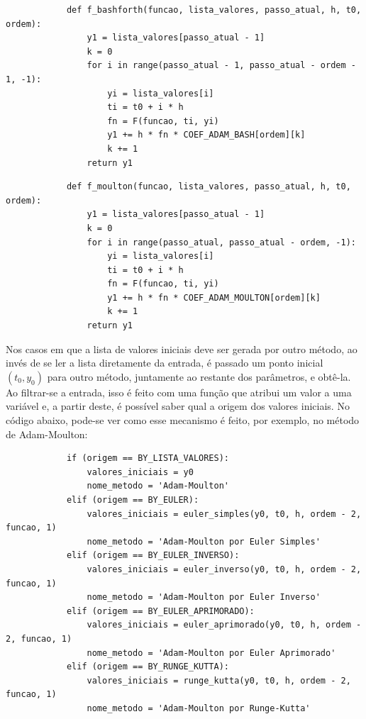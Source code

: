 \documentclass{article}
\begin{document}
\begin{otherlanguage}{brazil}
        \begin{lstlisting}
            def f_bashforth(funcao, lista_valores, passo_atual, h, t0, ordem):
                y1 = lista_valores[passo_atual - 1]
                k = 0
                for i in range(passo_atual - 1, passo_atual - ordem - 1, -1):
                    yi = lista_valores[i]
                    ti = t0 + i * h
                    fn = F(funcao, ti, yi)
                    y1 += h * fn * COEF_ADAM_BASH[ordem][k]
                    k += 1
                return y1
        \end{lstlisting}
        \begin{lstlisting}
            def f_moulton(funcao, lista_valores, passo_atual, h, t0, ordem):
                y1 = lista_valores[passo_atual - 1]
                k = 0
                for i in range(passo_atual, passo_atual - ordem, -1):
                    yi = lista_valores[i]
                    ti = t0 + i * h
                    fn = F(funcao, ti, yi)
                    y1 += h * fn * COEF_ADAM_MOULTON[ordem][k]
                    k += 1
                return y1
        \end{lstlisting}
        Nos casos em que a lista de valores iniciais deve ser gerada por outro método, ao invés de se ler a lista diretamente da entrada, é passado um ponto inicial $(t_0, y_0)$ para outro método, juntamente ao restante dos parâmetros, e obtê-la. Ao filtrar-se a entrada, isso é feito com uma função que atribui um valor a uma variável e, a partir deste, é possível saber qual a origem dos valores iniciais. No código abaixo, pode-se ver como esse mecanismo é feito, por exemplo, no método de Adam-Moulton:
        \begin{lstlisting}
            if (origem == BY_LISTA_VALORES):
                valores_iniciais = y0
                nome_metodo = 'Adam-Moulton'
            elif (origem == BY_EULER):
                valores_iniciais = euler_simples(y0, t0, h, ordem - 2, funcao, 1)
                nome_metodo = 'Adam-Moulton por Euler Simples'
            elif (origem == BY_EULER_INVERSO):
                valores_iniciais = euler_inverso(y0, t0, h, ordem - 2, funcao, 1)
                nome_metodo = 'Adam-Moulton por Euler Inverso'
            elif (origem == BY_EULER_APRIMORADO):
                valores_iniciais = euler_aprimorado(y0, t0, h, ordem - 2, funcao, 1)
                nome_metodo = 'Adam-Moulton por Euler Aprimorado'
            elif (origem == BY_RUNGE_KUTTA):
                valores_iniciais = runge_kutta(y0, t0, h, ordem - 2, funcao, 1)
                nome_metodo = 'Adam-Moulton por Runge-Kutta'
        \end{lstlisting}

\end{otherlanguage}
\end{document}
